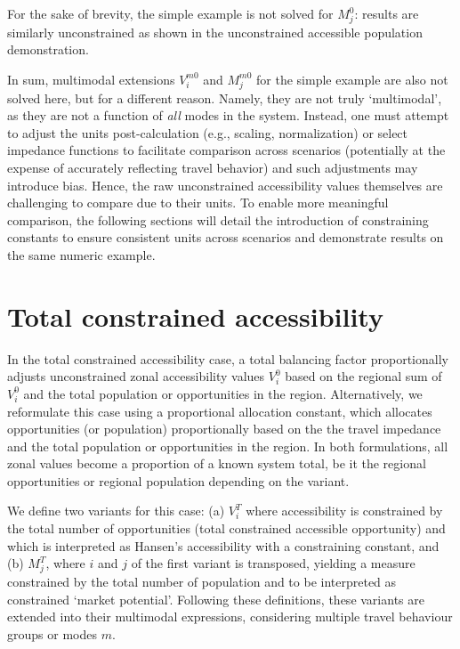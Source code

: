 \documentclass[
11pt, %
oneside, %
english, %
singlespacing, %
]{macthesis} %
\begin{document}
For the sake of brevity, the simple example is not solved for \(M_j^0\): results are similarly unconstrained as shown in the unconstrained accessible population demonstration.

In sum, multimodal extensions \(V^{m0}_{i}\) and \(M^{m0}_{j}\) for the simple example are also not solved here, but for a different reason. Namely, they are not truly `multimodal', as they are not a function of \emph{all} modes in the system. Instead, one must attempt to adjust the units post-calculation (e.g., scaling, normalization) or select impedance functions to facilitate comparison across scenarios (potentially at the expense of accurately reflecting travel behavior) and such adjustments may introduce bias. Hence, the raw unconstrained accessibility values themselves are challenging to compare due to their units. To enable more meaningful comparison, the following sections will detail the introduction of constraining constants to ensure consistent units across scenarios and demonstrate results on the same numeric example.

\section{Total constrained accessibility}\label{total-constrained-accessibility}

In the total constrained accessibility case, a total balancing factor proportionally adjusts unconstrained zonal accessibility values \(V^0_i\) based on the regional sum of \(V^0_i\) and the total population or opportunities in the region. Alternatively, we reformulate this case using a proportional allocation constant, which allocates opportunities (or population) proportionally based on the the travel impedance and the total population or opportunities in the region. In both formulations, all zonal values become a proportion of a known system total, be it the regional opportunities or regional population depending on the variant.

We define two variants for this case: (a) \(V_i^T\) where accessibility is constrained by the total number of opportunities (total constrained accessible opportunity) and which is interpreted as Hansen's accessibility with a constraining constant, and (b) \(M_j^T\), where \(i\) and \(j\) of the first variant is transposed, yielding a measure constrained by the total number of population and to be interpreted as constrained `market potential'. Following these definitions, these variants are extended into their multimodal expressions, considering multiple travel behaviour groups or modes \(m\).
\end{document}
